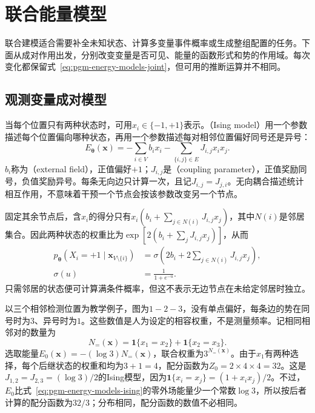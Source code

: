 \section{联合能量模型}
\label{sec:pgm-energy-models-joint-models}

联合建模适合需要补全未知状态、计算多变量事件概率或生成整组配置的任务。下面从成对作用出发，分别改变变量是否可见、能量的函数形式和势的作用域。每次变化都保留式~\eqref{eq:pgm-energy-models-joint}，但可用的推断运算并不相同。

\subsection{观测变量成对模型}
\label{sec:pgm-energy-models-pairwise}

当每个位置只有两种状态时，可用$x_i\in\{-1,+1\}$表示。（Ising model）用一个参数描述每个位置偏向哪种状态，再用一个参数描述每对相邻位置偏好同号还是异号：
\begin{equation}
  E_{\bm{\theta}}(\bm{x})
    =-\sum_{i\in V}b_ix_i
     -\sum_{\{i,j\}\in E}J_{i,j}x_ix_j.
  \label{eq:pgm-energy-models-ising}
\end{equation}
$b_i$称为（external field），正值偏好$+1$；$J_{i,j}$是（coupling parameter），正值奖励同号，负值奖励异号。每条无向边只计算一次，且记$J_{i,j}=J_{j,i}$。无向耦合描述统计相互作用，不意味着干预一个节点会按该参数改变另一个节点。

固定其余节点后，含$x_i$的得分只有$x_i(b_i+\sum_{j\in N(i)}J_{i,j}x_j)$，其中$N(i)$是邻居集合。因此两种状态的权重比为$\exp[2(b_i+\sum_jJ_{i,j}x_j)]$，从而
\begin{equation}
  \begin{aligned}
    p_{\bm{\theta}}(X_i=+1\mid\bm{x}_{V\setminus\{i\}})
      &=\sigma\!\left(2b_i+
           2\sum_{j\in N(i)}J_{i,j}x_j\right),\\
    \sigma(u)&=\frac{1}{1+e^{-u}}.
  \end{aligned}
  \label{eq:pgm-energy-models-ising-conditional}
\end{equation}
只需邻居的状态便可计算满条件概率，但这不表示无边节点在未给定邻居时独立。

以三个相邻检测位置为教学例子，图为$1-2-3$，没有单点偏好，每条边的势在同号时为$3$、异号时为$1$。这些数值是人为设定的相容权重，不是测量频率。记相同相邻对的数量为
\[
  N_{=}(\bm{x})
   =\mathbf{1}\{x_1=x_2\}+\mathbf{1}\{x_2=x_3\}.
\]
选取能量$E_0(\bm{x})=-(\log3)N_{=}(\bm{x})$，联合权重为$3^{N_{=}(\bm{x})}$。由于$x_1$有两种选择，每个后继状态的权重和均为$3+1=4$，配分函数为$Z_0=2\times4\times4=32$。这是$J_{1,2}=J_{2,3}=(\log3)/2$的Ising模型，因为$\mathbf{1}\{x_i=x_j\}=(1+x_ix_j)/2$。不过，$E_0$比式~\eqref{eq:pgm-energy-models-ising}的零外场能量少一个常数$\log3$，所以按后者计算的配分函数为$32/3$；分布相同，配分函数的数值不必相同。

